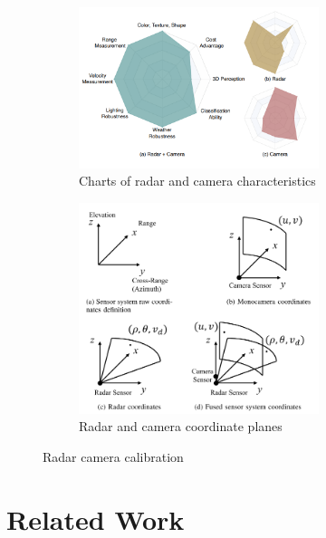\begin{figure}[hbpt]
    \centering
    \begin{subfigure}{0.3\linewidth}
        \includegraphics[width=7cm]{Figures/trade_off.png}
        \caption{Charts of radar and camera characteristics\cite{Yao_2023}}
        \label{subfig:trade_off_sub}
    \end{subfigure}
    \hspace{0.2\textwidth}
    \begin{subfigure}{0.3\linewidth}
        \includegraphics[width=7cm]{Figures/cam_radar_coordinates.png}
        \caption{Radar and camera coordinate planes\cite{8844649}}
        \label{subfig:cam_radar_sub}
    \end{subfigure}

    \caption{Radar camera calibration}
    \label{fig:trade_off_and_plane}
\end{figure}
\newpage


\section{Related Work}\label{sec:1-related_work}
